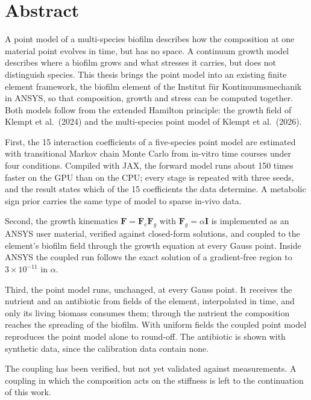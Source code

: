 \documentclass[12pt, a4paper, twoside]{report}
\newcommand{\bF}{\mathbf{F}}
\newcommand{\bI}{\mathbf{I}}
\begin{document}
\chapter*{Abstract}
A point model of a multi-species biofilm describes how the composition at one
material point evolves in time, but has no space. A continuum growth model
describes where a biofilm grows and what stresses it carries, but does not
distinguish species. This thesis brings the point model into an existing finite
element framework, the biofilm element of the Institut für Kontinuumsmechanik
in ANSYS, so that composition, growth and stress can be computed together. Both
models follow from the extended Hamilton principle: the growth field of Klempt
et al.\ (2024) and the multi-species point model of Klempt et al.\ (2026).

First, the 15 interaction coefficients of a five-species point model are
estimated with transitional Markov chain Monte Carlo from in-vitro time courses
under four conditions. Compiled with JAX, the forward model runs about 150 times
faster on the GPU than on the CPU; every stage is repeated with three seeds, and
the result states which of the 15 coefficients the data determine. A metabolic sign prior
carries the same type of model to sparse in-vivo data.

Second, the growth kinematics $\bF=\bF_e\bF_g$ with $\bF_g=\alpha\bI$ is
implemented as an ANSYS user material, verified against closed-form solutions,
and coupled to the element's biofilm field through the growth equation at
every Gauss point. Inside ANSYS the coupled run follows the exact solution of
a gradient-free region to $3\times10^{-11}$ in $\alpha$.

Third, the point model runs, unchanged, at every Gauss point. It receives the
nutrient and an antibiotic from fields of the element, interpolated in time, and
only its living biomass consumes them; through the nutrient the composition
reaches the spreading of the biofilm. With uniform fields the coupled point model
reproduces the point model alone to round-off. The antibiotic is shown with
synthetic data, since the calibration data contain none.

The coupling has been verified, but not yet validated against measurements. A
coupling in which the composition acts on the stiffness is left to the
continuation of this work.

\iffalse
\newpage
\end{document}
